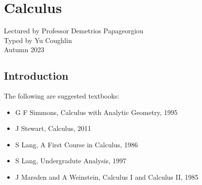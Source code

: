 \documentclass[../Year1/Year1.tex]{subfiles}
\begin{document}
\chapter{Calculus}
\renewcommand*\thesection{\arabic{section}}
\setcounter{section}{-1}
Lectured by Professor Demetrios Papageorgiou \\ Typed by Yu Coughlin \\
Autumn 2023

\section{Introduction}


The following are suggested textbooks:
\begin{itemize}
    \item G F Simmons, Calculus with Analytic Geometry, 1995
    \item J Stewart, Calculus, 2011
    \item S Lang, A First Course in Calculus, 1986
    \item S Lang, Undergradute Analysis, 1997
    \item J Marsden and A Weinstein, Calculus I and Calculus II, 1985
\end{itemize}

\tableofcontents\pagebreak
\end{document}
